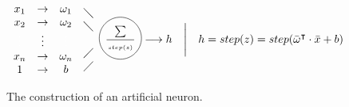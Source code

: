 \documentclass[10pt]{article}
\newcommand*\circled[1]{\tikz[baseline=(char.base)]{
   \node[shape=circle,draw,inner sep=1pt] (char) {#1};}}
\newif\ifen
\newif\ifde
\newcommand{\en}[1]{\ifen#1\fi}
\newcommand{\de}[1]{\ifde#1\fi}
\begin{document}
				\begin{figure}[H]
					\[
						\begin{array}{c}
							x_1\\
							x_2\\
							\color{white}\vdots\\
							x_n\\
							1\\
						\end{array}
						\begin{array}{c}
							\rightarrow\\
							\rightarrow\\
							\vdots\\
							\rightarrow\\
							\rightarrow\\
						\end{array}
						\begin{array}{c}
							\omega_1\\
							\omega_2\\
							\color{white}\vdots\\
							\omega_n\\
							b\\
						\end{array}
						\begin{array}{c}
							\diagdown\\
							\diagdown\\
							\\
							\diagup\\
							\diagup\\
						\end{array}
						\circled{${\sum\atop\ }\over{\ \atop step(z)}$}
						\longrightarrow h
						\quad\Biggl\lvert \quad h = step(z) = step(\bar{\omega}^\intercal \cdot \bar{x} + b)
					\]
					\caption{The construction of an artificial neuron.}
				\end{figure}

				\de{Das künstliche neuronale Netz baut sich aus vielen hintereinandergeschalteten Layern zusammen, welche wiederrum parallel geschaltete Neuronen enthalten:}
				\en{The artificial neural network is composed of many layers connected in series, which again contain neurons connected in parallel:}
\end{document}
